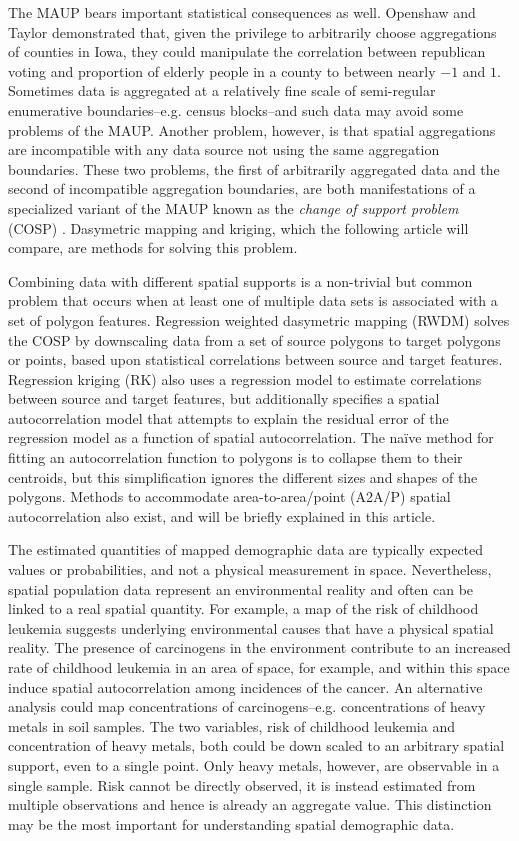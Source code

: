 The MAUP bears important statistical consequences as well.  Openshaw and Taylor \cite{openshaw79} demonstrated that, given the privilege to arbitrarily choose aggregations of counties in Iowa, they could manipulate the correlation between republican voting and proportion of elderly people in a county to between nearly $-1$ and $1$.  Sometimes data is aggregated at a relatively fine scale of semi-regular enumerative boundaries--e.g. census blocks--and such data may avoid some problems of the MAUP.  Another problem, however, is that spatial aggregations are incompatible with any data source not using the same aggregation boundaries.  These two problems, the first of arbitrarily aggregated data and the second of incompatible aggregation boundaries, are both manifestations of a specialized variant of the MAUP known as the {\em change of support problem} (COSP) \citep{cressie96, gelfand01}.  Dasymetric mapping and kriging, which the following article will compare, are methods for solving this problem.

Combining data with different spatial supports is a non-trivial but common problem that occurs when at least one of multiple data sets is associated with a set of polygon features.  Regression weighted dasymetric mapping (RWDM) solves the COSP by downscaling data from a set of source polygons to target polygons or points, based upon statistical correlations between source and target features.  Regression kriging (RK) also uses a regression model to estimate correlations between source and target features, but additionally specifies a spatial autocorrelation model that attempts to explain the residual error of the regression  model as a function of spatial autocorrelation.  The na\"{i}ve method for fitting an autocorrelation function to polygons is to collapse them to their centroids, but this simplification ignores the different sizes and shapes of the polygons.  Methods to accommodate area-to-area/point (A2A/P) spatial autocorrelation also exist, and will be briefly explained in this article.

The estimated quantities of mapped demographic data are typically expected values or probabilities, and not a physical measurement in space.  Nevertheless, spatial population data represent an environmental reality and often can be linked to a real spatial quantity.  For example, a map of the risk of childhood leukemia suggests underlying environmental causes that have a physical spatial reality.  The presence of carcinogens in the environment contribute to an increased rate of childhood leukemia in an area of space, for example, and within this space induce spatial autocorrelation among incidences of the cancer.  An alternative analysis could map concentrations of carcinogens--e.g. concentrations of heavy metals in soil samples.  The two variables, risk of childhood leukemia and concentration of heavy metals, both could be down scaled to an arbitrary spatial support, even to a single point.  Only heavy metals, however, are observable in a single sample.  Risk cannot be directly observed, it is instead estimated from multiple observations and hence is already an aggregate value.  This distinction may be the most important for understanding spatial demographic data.


